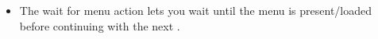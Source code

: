 
\begin{itemize}
\item The wait for menu action lets you wait until the menu is present/loaded before continuing with the next \gdstep{}.
\end{itemize}
